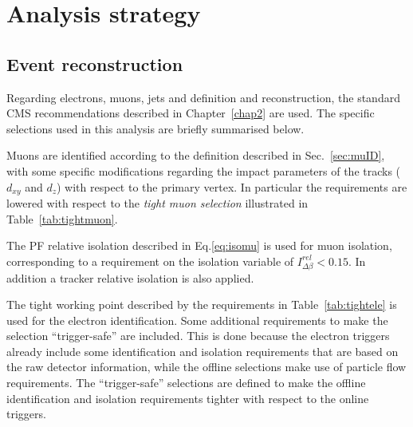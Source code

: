 \section{Analysis strategy}\label{chap5:analysis_strategy}

\subsection{Event reconstruction}

Regarding electrons, muons, jets and \MET definition and reconstruction, the standard CMS recommendations described in Chapter~\ref{chap2} are used. The specific selections used in this analysis are briefly summarised below.

Muons are identified according to the definition described in Sec.~\ref{sec:muID}, with some specific modifications regarding the impact parameters of the tracks ($d_{xy}$ and $d_z$) with respect to the primary vertex. In particular the requirements are lowered with respect to the \emph{tight muon selection} illustrated in Table~\ref{tab:tightmuon}.


The PF relative isolation described in Eq.\eqref{eq:isomu} is used for muon isolation, corresponding to a requirement on the isolation variable of $I^{rel}_{\Delta\beta} < 0.15$. In addition a tracker relative isolation is also applied.

The tight working point described by the requirements in Table~\ref{tab:tightele} is used for the electron identification. Some additional requirements to make the selection ``trigger-safe'' are included. This is done because the electron triggers already include some identification and isolation requirements that are based on the raw detector information, while the offline selections make use of particle flow requirements. The ``trigger-safe'' selections are defined to make the offline identification and isolation requirements tighter with respect to the online triggers.

